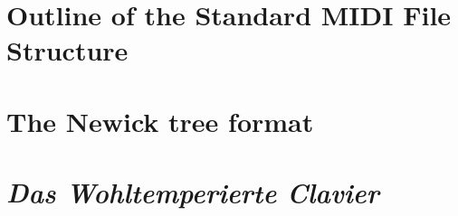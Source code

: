 \documentclass{book}
\begin{document}
\newpage
\section{Outline of the Standard MIDI File Structure}
\label{infomidi}


\newpage
\section{The Newick tree format}
\label{nwdoc}


\newpage
\section{\textsl{Das Wohltemperierte Clavier}}
\label{wtc1}

\end{document}
